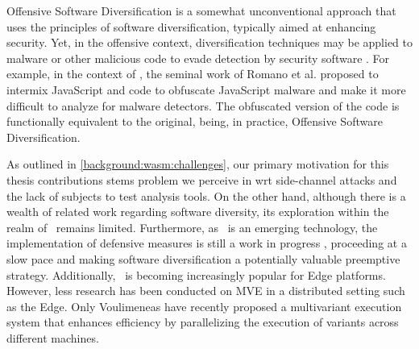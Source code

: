 Offensive Software Diversification is a somewhat unconventional approach that uses the principles of software diversification, typically aimed at enhancing security.
Yet, in the offensive context, diversification techniques may be applied to malware or other malicious code to evade detection by security software \cite{8714698}.
For example, in the context of \wasm, the seminal work of Romano et al.  \cite{wobfuscator} proposed to intermix JavaScript and \wasm code to obfuscate JavaScript malware and make it more difficult to analyze for malware detectors.
The obfuscated version of the code is functionally equivalent to the original, being, in practice, Offensive Software Diversification.


\label{sota:openchallenges}


As outlined in \autoref{background:wasm:challenges}, our primary motivation for this thesis contributions stems problem we perceive in \wasm wrt side-channel attacks and the lack of \wasm subjects to test analysis tools.
On the other hand, although there is a wealth of related work regarding software diversity, its exploration within the realm of \wasm\ remains limited. 
Furthermore, as \wasm\ is an emerging technology, the implementation of defensive measures is still a work in progress \cite{Narayan2021Swivel, johnson2021}, proceeding at a slow pace and making software diversification a potentially valuable preemptive strategy. 
Additionally, \wasm\ is becoming increasingly popular for Edge platforms. 
However, less research has been conducted on MVE in a distributed setting such as the Edge. Only Voulimeneas \etal \cite{voulimeneas2021dmvx} have recently proposed a multivariant execution system that enhances efficiency by parallelizing the execution of variants across different machines.




